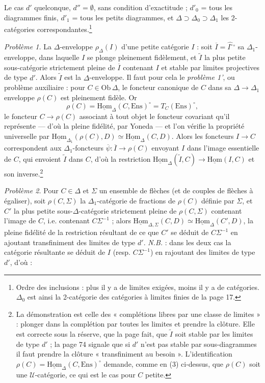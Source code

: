 \documentclass[11pt,a4paper]{article}
\begin{document}
Le cas $d'$ quelconque, $d'' = \emptyset$, sans condition d'exactitude ;
$d'_{0}$ = tous les diagrammes finis, $d'_{1}$ = tous les petits diagrammes,
et $\Delta \supset \Delta_{0} \supset \Delta_{1}$ les 2-catégories
correspondantes.\footnote{Ordre des inclusions : plus il y a de limites
exigées, moins il y a de catégories. $\Delta_{0}$ est ainsi la 2-catégorie
des catégories à limites finies de la page 17.}

\emph{Problème 1.} La $\Delta$-enveloppe $\rho_{\Delta}(I)$ d'une petite
catégorie $I$ : soit $\overline{I} = \widehat{I^{\circ}}{}^{\circ}$ sa
$\Delta_{1}$-enveloppe, dans laquelle $I$ se plonge pleinement fidèlement,
et $\widetilde{I}$ la plus petite sous-catégorie strictement pleine de
$\overline{I}$ contenant $I$ et stable par limites projectives de type
$d'$. Alors $\widetilde{I}$ est la $\Delta$-enveloppe. Il faut pour cela
le \emph{problème 1'}, ou problème auxiliaire : pour $C \in \mathrm{Ob}\,
\Delta$, le foncteur canonique de $C$ dans sa $\Delta \to \Delta_{1}$
enveloppe $\rho(C)$ est pleinement fidèle. Or
\[
\rho(C) = \underline{\mathrm{Hom}}_{\Delta}(C, \mathrm{Ens})^{\circ} =
T_{C}(\mathrm{Ens})^{\circ},
\]
le foncteur $C \to \rho(C)$ associant à tout objet le foncteur covariant
qu'il représente — d'où la pleine fidélité, par Yoneda — et l'on vérifie
la propriété universelle par $\underline{\mathrm{Hom}}_{\Delta_{1}}(\rho(C),
D) \simeq \underline{\mathrm{Hom}}_{\Delta}(C, D)$. Alors les foncteurs
$I \to C$ correspondent aux $\Delta_{1}$-foncteurs $\overline{\psi} :
\overline{I} \to \rho(C)$ envoyant $I$ dans l'image essentielle de $C$, qui
envoient $\widetilde{I}$ dans $C$, d'où la restriction
$\underline{\mathrm{Hom}}_{\Delta}(\widetilde{I}, C) \to \underline{\mathrm{Hom}}
(I, C)$ et son inverse.\footnote{La démonstration est celle des
« complétions libres par une classe de limites » : plonger dans la
complétion par toutes les limites et prendre la clôture. Elle est correcte
sous la réserve, que la page fait, que $\widetilde{I}$ soit stable par les
limites de type $d'$ ; la page 74 signale que si $d'$ n'est pas stable par
sous-diagrammes il faut prendre la clôture « transfiniment au besoin ».
L'identification $\rho(C) = \underline{\mathrm{Hom}}_{\Delta}(C,
\mathrm{Ens})^{\circ}$ demande, comme en (3) ci-dessus, que $\rho(C)$ soit
une $\mathcal{U}$-catégorie, ce qui est le cas pour $C$ petite.}

\emph{Problème 2.} Pour $C \in \Delta$ et $\Sigma$ un ensemble de flèches
(et de couples de flèches à égaliser), soit $\rho(C, \Sigma)$ la
$\Delta_{1}$-catégorie de fractions de $\rho(C)$ définie par $\Sigma$, et
$C'$ la plus petite sous-$\Delta$-catégorie strictement pleine de $\rho(C,
\Sigma)$ contenant l'image de $C$, i.e. contenant $C\Sigma^{-1}$ ; alors
$\underline{\mathrm{Hom}}_{\Delta,\Sigma}(C, D) \simeq \underline{\mathrm{Hom}}
_{\Delta}(C', D)$, la pleine fidélité de la restriction résultant de ce
que $C'$ se déduit de $C\Sigma^{-1}$ en ajoutant transfiniment des limites
de type $d'$. \emph{N.B.} : dans les deux cas la catégorie résultante se
déduit de $I$ (resp. $C\Sigma^{-1}$) en rajoutant des limites de type
$d'$, d'où :
\end{document}
